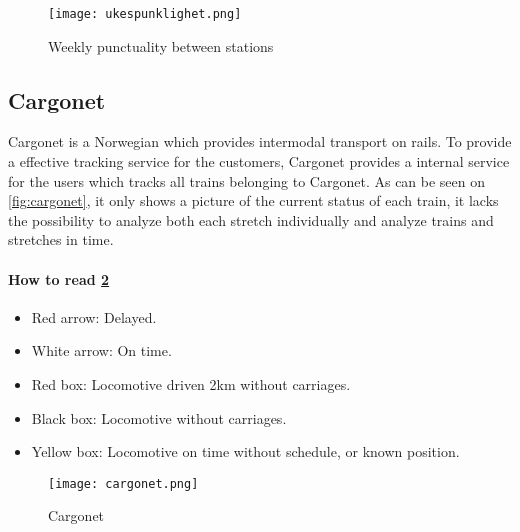 \begin{figure}[!htbp]
	\texttt{[image: ukespunklighet.png]}
	\caption[Weekly punctuality between stations]{Weekly punctuality between stations \cite{sintefPresis}}
	\label{fig:ukespunklighet}
\end{figure}
\pagebreak

\subsection{Cargonet} %
\label{sub:subsection_cargonet}

Cargonet is a Norwegian which provides intermodal transport on rails. To 
provide a effective tracking service for the customers, Cargonet provides a 
internal service for the users which tracks all trains belonging to Cargonet.
As can be seen on \vref{fig:cargonet}, it only shows a picture of the current
status of each train, it lacks the possibility to analyze both each stretch 
individually  and analyze trains and stretches in time.

\paragraph{How to read \ref{fig:cargonet}}
\begin{itemize}
	\item Red arrow:\hspace{4ex} Delayed.
	\item White arrow:\hspace{4ex} On time.
	\item Red box:\hspace{4ex} Locomotive driven 2km without carriages.
	\item Black box:\hspace{4ex} Locomotive without carriages.
	\item Yellow box:\hspace{4ex} Locomotive on time without schedule, or known position.
\end{itemize}

\begin{figure}[!htbp]
	\texttt{[image: cargonet.png]}
	\caption[Cargonet]{Cargonet \cite{cargonet}}
	\label{fig:cargonet}
\end{figure}
\pagebreak
